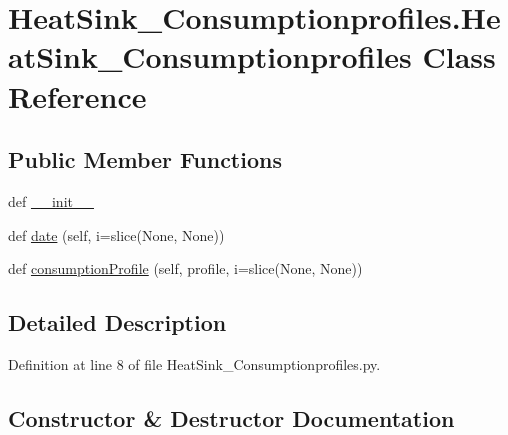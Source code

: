 \hypertarget{class_heat_sink___consumptionprofiles_1_1_heat_sink___consumptionprofiles}{}\section{Heat\+Sink\+\_\+\+Consumptionprofiles.\+Heat\+Sink\+\_\+\+Consumptionprofiles Class Reference}
\label{class_heat_sink___consumptionprofiles_1_1_heat_sink___consumptionprofiles}
\subsection*{Public Member Functions}
\begin{DoxyCompactItemize}
\item 
def \hyperlink{class_heat_sink___consumptionprofiles_1_1_heat_sink___consumptionprofiles_a0a98cfa6bb822aecb7b5b1f977def1f8}{\+\_\+\+\_\+init\+\_\+\+\_\+}
\item 
def \hyperlink{class_heat_sink___consumptionprofiles_1_1_heat_sink___consumptionprofiles_a5e52056f8f430a2aa642948af5246a2f}{date} (self, i=slice(None, None))
\item 
def \hyperlink{class_heat_sink___consumptionprofiles_1_1_heat_sink___consumptionprofiles_a62866d4ad34ff5cd3128356fd4996931}{consumption\+Profile} (self, profile, i=slice(None, None))
\end{DoxyCompactItemize}


\subsection{Detailed Description}


Definition at line 8 of file Heat\+Sink\+\_\+\+Consumptionprofiles.\+py.



\subsection{Constructor \& Destructor Documentation}
\mbox{\label{class_heat_sink___consumptionprofiles_1_1_heat_sink___consumptionprofiles_a0a98cfa6bb822aecb7b5b1f977def1f8}} 
